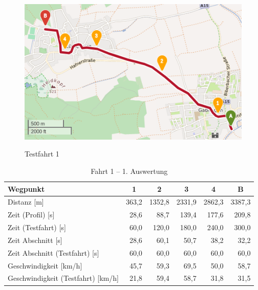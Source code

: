 \documentclass[12pt,a4paper]{article}
\begin{document}
\begin{figure}[h]
\centering
\includegraphics[width = 0.7 \textwidth]{../media/Fahrt1.png} \\
\caption{Testfahrt 1}
\label{fig:drive1}
\end{figure}

\begin{table}[]
\centering
\caption{Fahrt 1 -- 1. Auswertung}
\label{tab:driveinit}
\begin{tabular}{|l|r|r|r|r|r|}
\hline
Wegpunkt                               & \multicolumn{1}{c|}{1} & \multicolumn{1}{c|}{2} & \multicolumn{1}{c|}{3} & \multicolumn{1}{c|}{4} & \multicolumn{1}{c|}{B}  \\ \hline
Distanz {[}m{]}                        & 363,2                  & 1352,8                 & 2331,9                 & 2862,3                 & 3387,3                 \\ \hline
Zeit (Profil) {[}s{]}                  & 28,6                   & 88,7                   & 139,4                  & 177,6                  & 209,8                  \\ \hline
Zeit (Testfahrt) {[}s{]}               & 60,0                   & 120,0                  & 180,0                  & 240,0                  & 300,0                  \\ \hline
Zeit Abschnitt {[}s{]}                 & 28,6                   & 60,1                   & 50,7                   & 38,2                   & 32,2                   \\ \hline
Zeit Abschnitt (Testfahrt) {[}s{]}     & 60,0                   & 60,0                   & 60,0                   & 60,0                   & 60,0                   \\ \hline
Geschwindigkeit {[}km/h{]}             & 45,7                   & 59,3                   & 69,5                   & 50,0                   & 58,7                   \\ \hline
Geschwindigkeit (Testfahrt) {[}km/h{]} & 21,8                   & 59,4                   & 58,7                   & 31,8                   & 31,5                   \\ \hline
\end{tabular}
\end{table}
\end{document}
